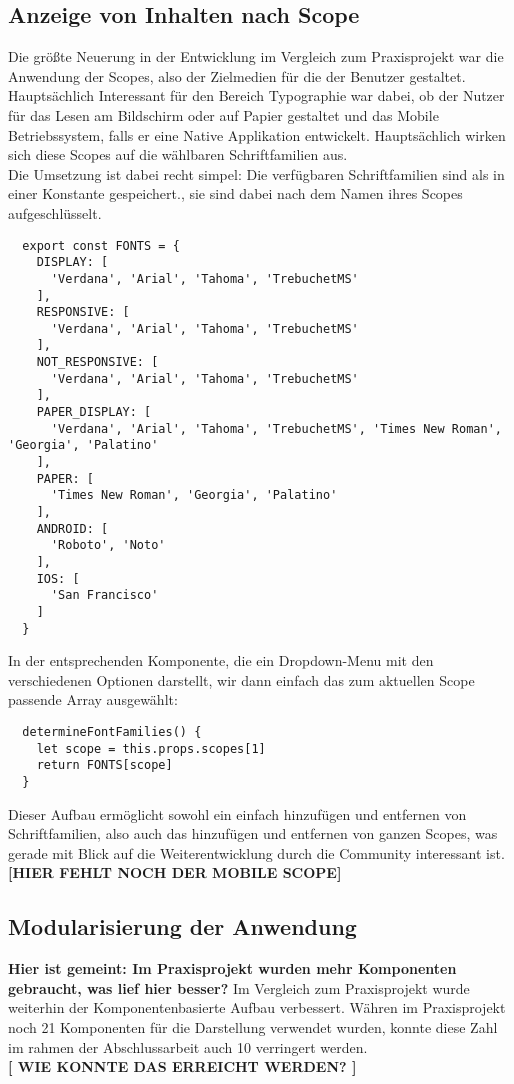 \subsection{Anzeige von Inhalten nach Scope}
Die größte Neuerung in der Entwicklung im Vergleich zum Praxisprojekt war die Anwendung der Scopes, also der Zielmedien für die der Benutzer gestaltet. Hauptsächlich Interessant für den Bereich Typographie war dabei, ob der Nutzer für das Lesen am Bildschirm oder auf Papier gestaltet und das Mobile Betriebssystem, falls er eine Native Applikation entwickelt. Hauptsächlich wirken sich diese Scopes auf die wählbaren Schriftfamilien aus.\\

Die Umsetzung ist dabei recht simpel: Die verfügbaren Schriftfamilien sind als in einer Konstante gespeichert., sie sind dabei nach dem Namen ihres Scopes aufgeschlüsselt.

\begin{lstlisting}
  export const FONTS = {
    DISPLAY: [
      'Verdana', 'Arial', 'Tahoma', 'TrebuchetMS'
    ],
    RESPONSIVE: [
      'Verdana', 'Arial', 'Tahoma', 'TrebuchetMS'
    ],
    NOT_RESPONSIVE: [
      'Verdana', 'Arial', 'Tahoma', 'TrebuchetMS'
    ],
    PAPER_DISPLAY: [
      'Verdana', 'Arial', 'Tahoma', 'TrebuchetMS', 'Times New Roman', 'Georgia', 'Palatino'
    ],
    PAPER: [
      'Times New Roman', 'Georgia', 'Palatino'
    ],
    ANDROID: [
      'Roboto', 'Noto'
    ],
    IOS: [
      'San Francisco'
    ]
  }
\end{lstlisting}

In der entsprechenden Komponente, die ein Dropdown-Menu mit den verschiedenen Optionen darstellt, wir dann einfach das zum aktuellen Scope passende Array ausgewählt:

\begin{lstlisting}
  determineFontFamilies() {
    let scope = this.props.scopes[1]
    return FONTS[scope]
  }
\end{lstlisting}

Dieser Aufbau ermöglicht sowohl ein einfach hinzufügen und entfernen von Schriftfamilien, also auch das hinzufügen und entfernen von ganzen Scopes, was gerade mit Blick auf die Weiterentwicklung durch die Community interessant ist.\\

\textbf{[HIER FEHLT NOCH DER MOBILE SCOPE]}\\

\subsection{Modularisierung der Anwendung}
\textbf{Hier ist gemeint: Im Praxisprojekt wurden mehr Komponenten gebraucht, was lief hier besser?}
Im Vergleich zum Praxisprojekt wurde weiterhin der Komponentenbasierte Aufbau verbessert. Währen im Praxisprojekt noch 21 Komponenten für die Darstellung verwendet wurden, konnte diese Zahl im rahmen der Abschlussarbeit auch 10 verringert werden.\\
\textbf{[ WIE KONNTE DAS ERREICHT WERDEN? ]}

